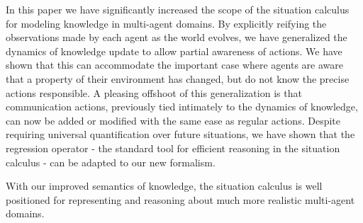 \documentclass[letterpaper]{article}
\begin{document}
In this paper we have significantly increased the scope of the situation
calculus for modeling knowledge in multi-agent domains. By explicitly
reifying the observations made by each agent as the world evolves,
we have generalized the dynamics of knowledge update to allow partial
awareness of actions. We have shown that this can accommodate the
important case where agents are aware that a property of their environment
has changed, but do not know the precise actions responsible. A pleasing
offshoot of this generalization is that communication actions, previously
tied intimately to the dynamics of knowledge, can now be added or
modified with the same ease as regular actions. Despite requiring
universal quantification over future situations, we have shown that
the regression operator - the standard tool for efficient reasoning
in the situation calculus - can be adapted to our new formalism.

With our improved semantics of knowledge, the situation calculus is
well positioned for representing and reasoning about much more realistic
multi-agent domains.



\end{document}
